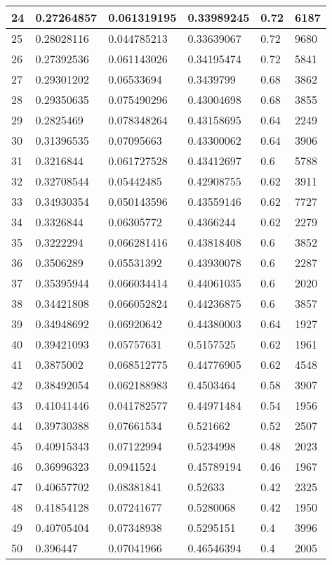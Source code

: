 \begin{longtable}{|l|l|l|l|l|l|}
24 & 0.27264857 & 0.061319195 & 0.33989245 & 0.72 & 6187 \\ \hline 
25 & 0.28028116 & 0.044785213 & 0.33639067 & 0.72 & 9680 \\ \hline 
26 & 0.27392536 & 0.061143026 & 0.34195474 & 0.72 & 5841 \\ \hline 
27 & 0.29301202 & 0.06533694 & 0.3439799 & 0.68 & 3862 \\ \hline 
28 & 0.29350635 & 0.075490296 & 0.43004698 & 0.68 & 3855 \\ \hline 
29 & 0.2825469 & 0.078348264 & 0.43158695 & 0.64 & 2249 \\ \hline 
30 & 0.31396535 & 0.07095663 & 0.43300062 & 0.64 & 3906 \\ \hline 
31 & 0.3216844 & 0.061727528 & 0.43412697 & 0.6 & 5788 \\ \hline 
32 & 0.32708544 & 0.05442485 & 0.42908755 & 0.62 & 3911 \\ \hline 
33 & 0.34930354 & 0.050143596 & 0.43559146 & 0.62 & 7727 \\ \hline 
34 & 0.3326844 & 0.06305772 & 0.4366244 & 0.62 & 2279 \\ \hline 
35 & 0.3222294 & 0.066281416 & 0.43818408 & 0.6 & 3852 \\ \hline 
36 & 0.3506289 & 0.05531392 & 0.43930078 & 0.6 & 2287 \\ \hline 
37 & 0.35395944 & 0.066034414 & 0.44061035 & 0.6 & 2020 \\ \hline 
38 & 0.34421808 & 0.066052824 & 0.44236875 & 0.6 & 3857 \\ \hline 
39 & 0.34948692 & 0.06920642 & 0.44380003 & 0.64 & 1927 \\ \hline 
40 & 0.39421093 & 0.05757631 & 0.5157525 & 0.62 & 1961 \\ \hline 
41 & 0.3875002 & 0.068512775 & 0.44776905 & 0.62 & 4548 \\ \hline 
42 & 0.38492054 & 0.062188983 & 0.4503464 & 0.58 & 3907 \\ \hline 
43 & 0.41041446 & 0.041782577 & 0.44971484 & 0.54 & 1956 \\ \hline 
44 & 0.39730388 & 0.07661534 & 0.521662 & 0.52 & 2507 \\ \hline 
45 & 0.40915343 & 0.07122994 & 0.5234998 & 0.48 & 2023 \\ \hline 
46 & 0.36996323 & 0.0941524 & 0.45789194 & 0.46 & 1967 \\ \hline 
47 & 0.40657702 & 0.08381841 & 0.52633 & 0.42 & 2325 \\ \hline 
48 & 0.41854128 & 0.07241677 & 0.5280068 & 0.42 & 1950 \\ \hline 
49 & 0.40705404 & 0.07348938 & 0.5295151 & 0.4 & 3996 \\ \hline 
50 & 0.396447 & 0.07041966 & 0.46546394 & 0.4 & 2005 \\ \hline 
\end{longtable}